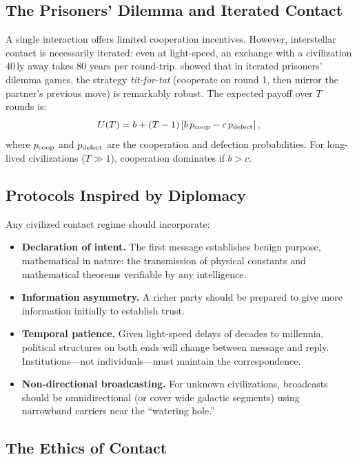\documentclass[12pt,a4paper]{article}
\begin{document}
\subsection{The Prisoners' Dilemma and Iterated Contact}

A single interaction offers limited cooperation incentives. However,
interstellar contact is necessarily iterated: even at light-speed, an exchange
with a civilization 40\,ly away takes 80 years per round-trip. \citet{Axelrod1984}
showed that in iterated prisoners' dilemma games, the strategy
\emph{tit-for-tat} (cooperate on round 1, then mirror the partner's previous
move) is remarkably robust. The expected payoff over $T$ rounds is:
\begin{equation}
  U(T) = b + (T-1)\left[b\,p_{\rm coop} - c\,p_{\rm defect}\right],
  \label{eq:iterated}
\end{equation}
where $p_{\rm coop}$ and $p_{\rm defect}$ are the cooperation and defection
probabilities. For long-lived civilizations ($T \gg 1$), cooperation dominates
if $b > c$.

\subsection{Protocols Inspired by Diplomacy}

Any civilized contact regime should incorporate:
\begin{itemize}[noitemsep]
  \item \textbf{Declaration of intent.} The first message establishes benign
    purpose, mathematical in nature: the transmission of physical constants and
    mathematical theorems verifiable by any intelligence.
  \item \textbf{Information asymmetry.} A richer party should be prepared to
    give more information initially to establish trust.
  \item \textbf{Temporal patience.} Given light-speed delays of decades to
    millennia, political structures on both ends will change between message and
    reply. Institutions---not individuals---must maintain the correspondence.
  \item \textbf{Non-directional broadcasting.} For unknown civilizations,
    broadcasts should be omnidirectional (or cover wide galactic segments) using
    narrowband carriers near the ``watering hole.''
\end{itemize}

\subsection{The Ethics of Contact}
\end{document}
